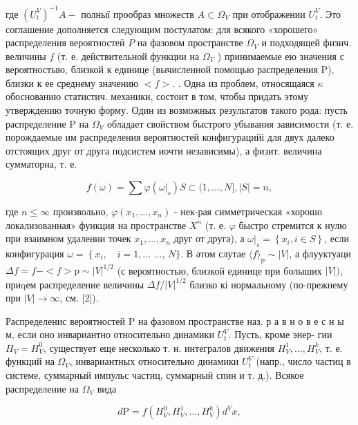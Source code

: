 \documentclass[10pt]{article}
\begin{document}
где $\left(U_{t}^{V}\right)^{-1} A-$ полныї прообраз множеств $A \subset \Omega_{V}$ при отображении $U_{t}^{V}$. Это соглашение дополняется следующим постулатом: для всякого «хорошего» распределения вероятностеӥ $P$ на фазовом пространстве $\Omega_{V}$ и подходящей физич. величины $f$ (т. е. деӥствительной функции на $\Omega_{V}$ ) принимаемые ею значения с вероятностыю, близкой к единице (вычисленной помощью распределения P), близки к ее среднему значению $<f>$. . Одна из проблем, относящаяся $\kappa$ обоснованию статистич. механики, состоит в том, чтобы придать этому утверждению точную форму. Один из возможных результатов такого рода: пусть распределение $\mathrm{P}$ на $\Omega_{V}$ обладает свойством быстрого убывания зависимости (т. е. порождаемые им распределения вероятностей конфигурацийі для двух далеко отстоящих друг от друга подсистем иочти независимы), а физит. величина сумматорна, т. е.



\[

f(\omega)=\sum \varphi\left(\left.\omega\right|_{s}\right) S \subset(1, \ldots, N],|S|=n,

\]



где $n \leqslant \infty$ произвольно, $\varphi\left(x_{1}, \ldots, x_{n}\right)$ - нек-рая симметрическая «хорошо локализованная» функция на пространстве $X^{n}$ (т. е. $\varphi$ быстро стремится к нулю при взаимном удалении точек $x_{1}, \ldots, x_{n}$ друг от друга), а $\left.\omega\right|_{s}=\left\{x_{i}, i \in S\right\}$, если конфигурация $\omega=\left\{x_{i}, \quad i=1, \ldots\right.$ ..., $N\}$. В әтом слутае $\langle f\rangle_{\mathrm{p}} \sim|V|$, а флууктуаци $\Delta f=f-<f>\mathrm{p} \sim|V|^{1 / 2}$ (с вероятностью, близкой единице при болыших $|V|)$, приqем распределение величины $\Delta f /|V|^{1 / 2}$ близко кі нормальному (по-прежнему при $|V| \rightarrow \infty$, см. [2]).



Распределенис вероятностей $\mathrm{P}$ на фазовом пространстве наз. р а в н о в е с н ы м, если оно инвариантно относительно динамики $U_{t}^{V}$. Пусть, кроме энер- гии $H_{V}=H_{V}^{0}$, существует еще несколько т. н. интегралов движения $H_{V}^{1}, \ldots, H_{V}^{k}$, т. е. функций на $\Omega_{V}$, инвариантных относительно динамики $U_{t}^{V}$ (напр., число частиц в системе, суммарный импульс частиц, суммарный спин и т. д.). Всякое распределение на $\Omega_{V}$ вида



\[

d \mathrm{P}=f\left(H_{V}^{0}, H_{V}^{1}, \ldots, H_{V}^{k}\right) d^{V} x,

\]
\end{document}
